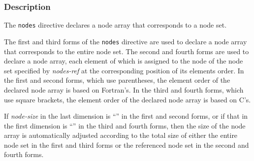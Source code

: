 \subsubsection*{Description}

The {\tt nodes} directive declares a node array that corresponds to a node set.

The first and third forms of the {\tt nodes} directive are used to declare a node
array that corresponds to the entire node set.
The second and fourth forms are used to declare a node array, each
element of which is assigned to the node of the node set specified by {\it
nodes-ref} at the corresponding position of its elements order.
%
In the first and second forms, which use parentheses,
the element order of the declared node array is based on Fortran’s.
%
In the third and fourth forms, which use square brackets,
the element order of the declared node array is based on C’s.

%

If {\it node-size} in the last dimension is ``{\tt *}'' in the first and
second forms, or if that in the first dimension is ``{\tt *}'' in the
third and fourth forms, then the size of the node array is automatically
adjusted according to the total size of either the entire node set in
the first and third forms or the referenced node set in the second and
fourth forms.

